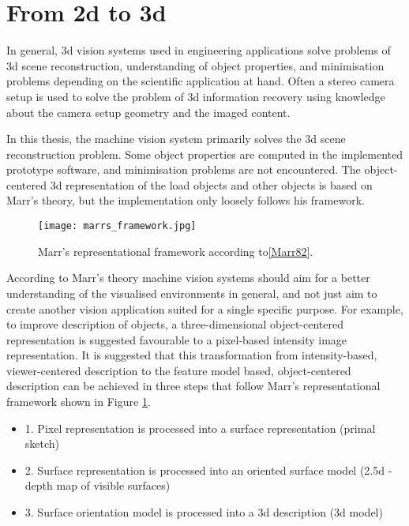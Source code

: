 \documentclass[12pt,a4paper,oneside,pdftex]{report}
\begin{document}
{\section{From 2d to 3d}
\label{section:from_2d_to_3d}

In general, 3d vision systems used in engineering applications solve problems of 3d scene reconstruction, understanding of object properties, and minimisation problems depending on the scientific application at hand. Often a stereo camera setup is used to solve the problem of 3d information recovery using knowledge about the camera setup geometry and the imaged content\cite{Sonka07}. 

In this thesis, the machine vision system primarily solves the 3d scene reconstruction problem. Some object properties are computed in the implemented prototype software, and minimisation problems are not encountered. The object-centered 3d representation of the load objects and other objects is based on Marr's theory, but the implementation only loosely follows his framework. 

\begin{figure}[ht]
  \begin{center}
    \texttt{[image: marrs\_framework.jpg]}
    \caption{Marr's representational framework according to\ref{Marr82}.}
    \label{fig:marrs_framework}
  \end{center}
\end{figure}

According to Marr's theory machine vision systems should aim for a better understanding of the visualised environments in general, and not just aim to create another vision application suited for a single specific purpose. For example, to improve description of objects, a three-dimensional object-centered representation is suggested favourable to a pixel-based intensity image representation. It is suggested that this transformation from intensity-based, viewer-centered description to the feature model based, object-centered description can be achieved in three steps that follow Marr's representational framework shown in Figure \ref{fig:marrs_framework}.

\begin{itemize}
\label{list:objectcenteredmodeling}
\setlength{\itemsep}{0pt}
\item 1. Pixel representation is processed into a surface representation (primal sketch)
\item 2. Surface representation is processed into an oriented surface model (2.5d - depth map of visible surfaces)
\item 3. Surface orientation model is processed into a 3d description (3d model)
\end{itemize}

}
\end{document}
